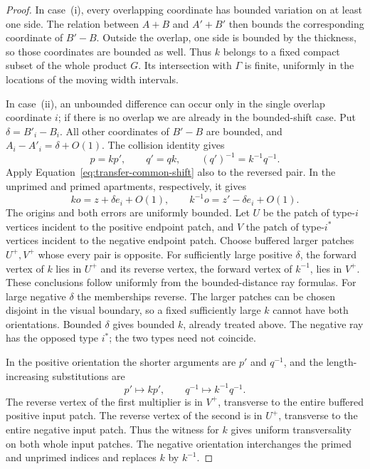 \begin{proof}
In case~\textup{(i)}, every overlapping coordinate has bounded variation
on at least one side. The relation between $A+B$ and $A'+B'$ then bounds
the corresponding coordinate of $B'-B$. Outside the overlap, one side
is bounded by the thickness, so those coordinates are bounded as well.
Thus $k$ belongs to a fixed compact subset of the whole product $G$.
Its intersection with $\Gamma$ is finite, uniformly in the locations
of the moving width intervals.

In case~\textup{(ii)}, an unbounded difference can occur only in
the single overlap coordinate $i$; if there is no overlap we are
already in the bounded-shift case. Put $\delta=B'_i-B_i$.
All other coordinates of $B'-B$ are bounded, and
$A_i-A'_i=\delta+O(1)$. The collision identity gives
\[
 p=kp',\qquad q'=qk,\qquad (q')^{-1}=k^{-1}q^{-1}.
\]
Apply Equation~\eqref{eq:transfer-common-shift} also to the reversed
pair. In the unprimed and primed apartments, respectively, it gives
\[
 ko=z+\delta e_i+O(1),\qquad
 k^{-1}o=z'-\delta e_i+O(1).
\]
The origins and both errors are uniformly bounded. Let $U$ be the
patch of type-$i$ vertices incident to the positive endpoint patch,
and $V$ the patch of type-$i^*$ vertices incident to the negative
endpoint patch. Choose buffered larger patches $U^+,V^+$ whose
every pair is opposite. For sufficiently large positive $\delta$,
the forward vertex of $k$ lies in $U^+$ and its reverse vertex,
the forward vertex of $k^{-1}$, lies in $V^+$. These conclusions
follow uniformly from the bounded-distance ray formulas. For large
negative $\delta$ the memberships reverse. The larger patches can
be chosen disjoint in the visual boundary, so a fixed sufficiently
large $k$ cannot have both orientations. Bounded $\delta$ gives
bounded $k$, already treated above. The negative ray has the opposed
type $i^*$; the two types need not coincide.

In the positive orientation the shorter arguments are $p'$ and
$q^{-1}$, and the length-increasing substitutions are
\[
 p'\longmapsto kp',\qquad
 q^{-1}\longmapsto k^{-1}q^{-1}.
\]
The reverse vertex of the first multiplier is in $V^+$, transverse
to the entire buffered positive input patch. The reverse vertex of
the second is in $U^+$, transverse to the entire negative input
patch. Thus the witness for $k$ gives uniform transversality on
both whole input patches. The negative orientation interchanges the
primed and unprimed indices and replaces $k$ by $k^{-1}$.


\end{proof}
